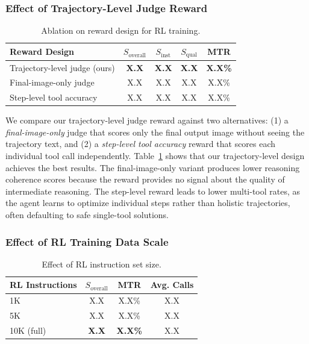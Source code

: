 \documentclass[11pt]{article}
\begin{document}
\subsubsection{Effect of Trajectory-Level Judge Reward}

\begin{table}[t]
\centering
\caption{Ablation on reward design for RL training.}
\label{tab:ablation_reward}
\begin{tabular}{lcccc}
\toprule
\textbf{Reward Design} & $S_{\text{overall}}$ & $S_{\text{inst}}$ & $S_{\text{qual}}$ & MTR \\
\midrule
Trajectory-level judge (ours) & \textbf{X.X} & \textbf{X.X} & \textbf{X.X} & \textbf{X.X\%} \\
Final-image-only judge & X.X & X.X & X.X & X.X\% \\
Step-level tool accuracy & X.X & X.X & X.X & X.X\% \\
\bottomrule
\end{tabular}
\end{table}



We compare our trajectory-level judge reward against two alternatives: (1) a \textit{final-image-only} judge that scores only the final output image without seeing the trajectory text, and (2) a \textit{step-level tool accuracy} reward that scores each individual tool call independently. Table~\ref{tab:ablation_reward} shows that our trajectory-level design achieves the best results. The final-image-only variant produces lower reasoning coherence scores because the reward provides no signal about the quality of intermediate reasoning. The step-level reward leads to lower multi-tool rates, as the agent learns to optimize individual steps rather than holistic trajectories, often defaulting to safe single-tool solutions.

\subsubsection{Effect of RL Training Data Scale}

\begin{table}[t]
\centering
\caption{Effect of RL instruction set size.}
\label{tab:ablation_rl_scale}
\begin{tabular}{lccc}
\toprule
\textbf{RL Instructions} & $S_{\text{overall}}$ & MTR & Avg. Calls \\
\midrule
1K & X.X & X.X\% & X.X \\
5K & X.X & X.X\% & X.X \\
10K (full) & \textbf{X.X} & \textbf{X.X\%} & X.X \\
\bottomrule
\end{tabular}
\end{table}
\end{document}
